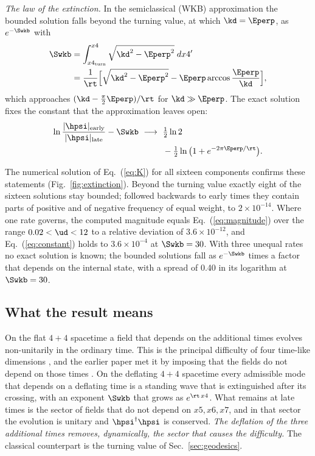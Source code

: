\emph{The law of the extinction.} In the semiclassical (WKB) approximation the bounded solution
falls beyond the turning value, at which $\kd=\Eperp$, as $e^{-\Swkb}$ with
\begin{align}
\Swkb&=\int_{x4_{\mathrm{turn}}}^{x4}\sqrt{\kd^{2}-\Eperp^{2}}\;dx4'\nonumber\\
&=\frac{1}{\rt}\Big[\sqrt{\kd^{2}-\Eperp^{2}}-\Eperp\arccos\frac{\Eperp}{\kd}\Big],
\label{eq:Swkb}
\end{align}
which approaches $(\kd-\tfrac{\pi}{2}\Eperp)/\rt$ for $\kd\gg\Eperp$. The exact solution fixes the
constant that the approximation leaves open:
\begin{equation}
\begin{aligned}
\ln\frac{|\hpsi|_{\mathrm{early}}}{|\hpsi|_{\mathrm{late}}}-\Swkb\ \longrightarrow\ {}&\tfrac12\ln2\\
&-\tfrac12\ln\big(1+e^{-2\pi\Eperp/\rt}\big).
\end{aligned}
\label{eq:constant}
\end{equation}

The numerical solution of Eq.~(\ref{eq:K}) for all sixteen components confirms these statements
(Fig.~\ref{fig:extinction}). Beyond the turning value exactly eight of the sixteen solutions stay
bounded; followed backwards to early times they contain parts of positive and of negative frequency
of equal weight, to $2\times10^{-14}$. Where one rate governs, the computed magnitude equals
Eq.~(\ref{eq:magnitude}) over the range $0.02<\ud<12$ to a relative deviation of
$3.6\times10^{-12}$, and Eq.~(\ref{eq:constant}) holds to $3.6\times10^{-4}$ at $\Swkb=30$. With
three unequal rates no exact solution is known; the bounded solutions fall as $e^{-\Swkb}$ times a
factor that depends on the internal state, with a spread of 0.40 in its logarithm at $\Swkb=30$.

\subsection{What the result means}

On the flat $4+4$ spacetime a field that depends on the additional times evolves non-unitarily in
the ordinary time. This is the principal difficulty of four time-like dimensions
\cite{Tegmark1997,CraigWeinstein2009}, and the earlier paper met it by imposing that the fields do
not depend on those times \cite{Flat1644}. On the deflating $4+4$ spacetime every admissible mode
that depends on a deflating time is a standing wave that is extinguished after its crossing, with an
exponent $\Swkb$ that grows as $e^{\rt\,x4}$. What remains at late times is the sector of fields
that do not depend on $x5,x6,x7$, and in that sector the evolution is unitary and
$\hpsi^\dagger\hpsi$ is conserved. \emph{The deflation of the three additional times removes,
dynamically, the sector that causes the difficulty.} The classical counterpart is the turning value
of Sec.~\ref{sec:geodesics}.

